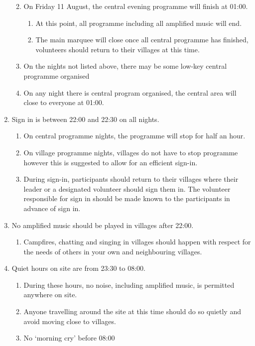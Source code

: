 \documentclass[a4paper, 11pt]{report}
\def\enumMarginIndentOne{4em}
\def\enumMarginIndentTwo{5em}
\begin{document}
\begin{enumerate}
\begin{enumerate}[leftmargin=\enumMarginIndentOne]
\begin{enumerate}[leftmargin=\enumMarginIndentTwo]
            \end{enumerate}
            \item On Friday 11 August, the central evening programme will finish at 01:00.
            \begin{enumerate}[leftmargin=\enumMarginIndentTwo]
                \item At this point, all programme including all amplified music will end. 
                \item The main marquee will close once all central programme has finished, volunteers should return to their villages at this time.
            \end{enumerate}
            \item On the nights not listed above, there may be some low-key central programme organised
            \item On any night there is central program organised, the central area will close to everyone at 01:00. 
        \end{enumerate}
        \item Sign in is between 22:00 and 22:30 on all nights.
        \begin{enumerate}[leftmargin=\enumMarginIndentOne]
            \item On central programme nights, the programme will stop for half an hour.
            \item On village programme nights, villages do not have to stop programme however this is suggested to allow for an efficient sign-in.
            \item During sign-in, participants should return to their villages where their leader or a designated volunteer should sign them in. The volunteer responsible for sign in should be made known to the participants in advance of sign in.
        \end{enumerate}
        \item No amplified music should be played in villages after 22:00.
        \begin{enumerate}[leftmargin=\enumMarginIndentOne]
            \item Campfires, chatting and singing in villages should happen with respect for the needs of others in your own and neighbouring villages.
        \end{enumerate}
        \item Quiet hours on site are from 23:30 to 08:00.
        \begin{enumerate}[leftmargin=\enumMarginIndentOne]
            \item During these hours, no noise, including amplified music, is permitted anywhere on site.
            \item Anyone travelling around the site at this time should do so quietly and avoid moving close to villages.
            \item No `morning cry' before 08:00
        \end{enumerate}
    \end{enumerate}
\end{document}
